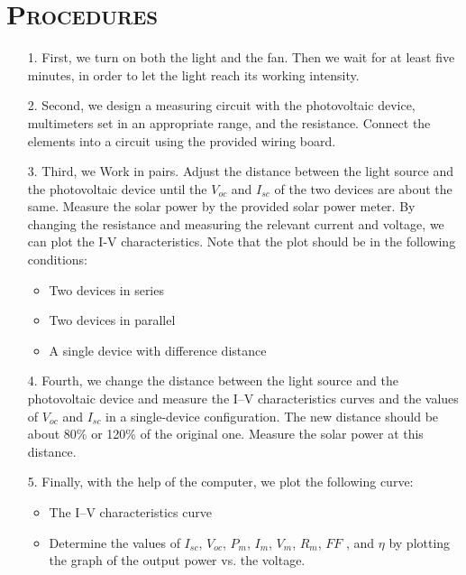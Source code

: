 \documentclass[a4paper,12pt]{article}
\begin{document}
\section{\textsc{Procedures \cite{labmanual}}}
\begin{itemize}
\item[1.] First, we turn on both the light and the fan. Then we wait for at least five minutes, in order to let the light reach its working intensity.
\item[2.] Second, we design a measuring circuit with the photovoltaic device, multimeters set in an appropriate range, and the resistance. Connect the elements into a circuit using the provided wiring board.
\item[3.] Third, we Work in pairs. Adjust the distance between the light source and the photovoltaic device until the $V_{oc}$ and $I_{sc}$ of the two devices are about the same. Measure the solar power by the provided solar power meter. By changing the resistance and measuring the relevant current and voltage, we can plot the I-V characteristics. Note that the plot should be in the following conditions:
\begin{itemize}
\item Two devices in series
\item Two devices in parallel
\item A single device with difference distance
\end{itemize}
\item[4.] Fourth, we change the distance between the light source and the photovoltaic device and measure the I–V characteristics curves and the values of $V_{oc}$ and $I_{sc}$ in a single-device configuration. The new distance should be about 80\% or 120\% of the original one. Measure the solar power at this distance.
\item[5.] Finally, with the help of the computer, we plot the following curve:
\begin{itemize}
\item The I–V characteristics curve
\item Determine the values of $I_{sc}$, $V_{oc}$, $P_m$, $I_m$, $V_m$, $R_m$, $F F$ , and $\eta$ by plotting the graph of the output power vs. the voltage.
\end{itemize}
\end{itemize}
\end{document}
